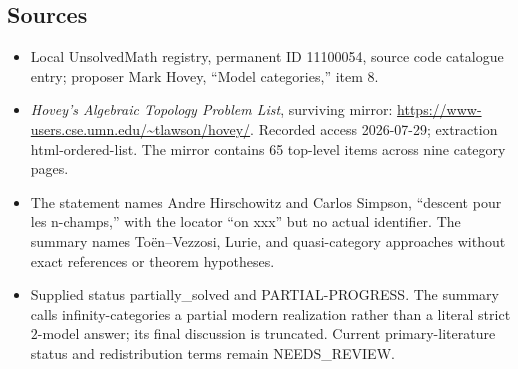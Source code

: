 \documentclass[11pt]{article}
\begin{document}
\subsection{Sources}
\begin{itemize}
\item Local UnsolvedMath registry, permanent ID 11100054, source code catalogue entry; proposer Mark Hovey, ``Model categories,'' item 8.
\item \emph{Hovey's Algebraic Topology Problem List}, surviving mirror: \url{https://www-users.cse.umn.edu/~tlawson/hovey/}. Recorded access 2026-07-29; extraction html-ordered-list. The mirror contains 65 top-level items across nine category pages.
\item The statement names Andre Hirschowitz and Carlos Simpson, ``descent pour les n-champs,'' with the locator ``on xxx'' but no actual identifier. The summary names To\"en--Vezzosi, Lurie, and quasi-category approaches without exact references or theorem hypotheses.
\item Supplied status partially\_solved and PARTIAL-PROGRESS. The summary calls infinity-categories a partial modern realization rather than a literal strict \(2\)-model answer; its final discussion is truncated. Current primary-literature status and redistribution terms remain NEEDS\_REVIEW.
\end{itemize}
\end{document}
